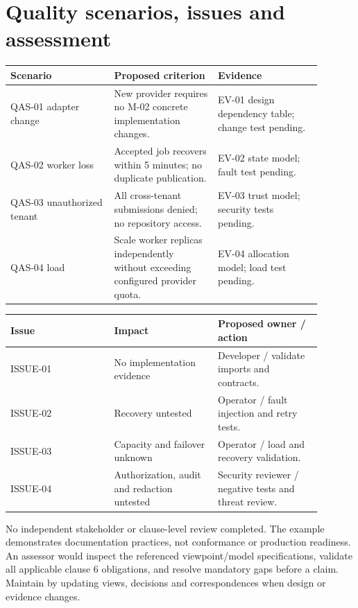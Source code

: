 \documentclass[11pt,letterpaper]{article}
\newcommand{\docsection}[1]{\Needspace{5\baselineskip}\section{#1}}
\begin{document}
\docsection{Quality scenarios, issues and assessment}
\begin{longtable}{@{}>{\RaggedRight\arraybackslash}p{0.297\linewidth}>{\RaggedRight\arraybackslash}p{0.297\linewidth}>{\RaggedRight\arraybackslash}p{0.297\linewidth}@{}}
\toprule
\textbf{Scenario} & \textbf{Proposed criterion} & \textbf{Evidence}\\\midrule
\endhead
QAS-01 adapter change & New provider requires no M-02 concrete implementation changes. & EV-01 design dependency table; change test pending.\\
QAS-02 worker loss & Accepted job recovers within 5 minutes; no duplicate publication. & EV-02 state model; fault test pending.\\
QAS-03 unauthorized tenant & All cross-tenant submissions denied; no repository access. & EV-03 trust model; security tests pending.\\
QAS-04 load & Scale worker replicas independently without exceeding configured provider quota. & EV-04 allocation model; load test pending.\\
\bottomrule
\end{longtable}
\begin{longtable}{@{}>{\RaggedRight\arraybackslash}p{0.297\linewidth}>{\RaggedRight\arraybackslash}p{0.297\linewidth}>{\RaggedRight\arraybackslash}p{0.297\linewidth}@{}}
\toprule
\textbf{Issue} & \textbf{Impact} & \textbf{Proposed owner / action}\\\midrule
\endhead
ISSUE-01 & No implementation evidence & Developer / validate imports and contracts.\\
ISSUE-02 & Recovery untested & Operator / fault injection and retry tests.\\
ISSUE-03 & Capacity and failover unknown & Operator / load and recovery validation.\\
ISSUE-04 & Authorization, audit and redaction untested & Security reviewer / negative tests and threat review.\\
\bottomrule
\end{longtable}
No independent stakeholder or clause-level review completed. The example demonstrates documentation practices, not conformance or production readiness. An assessor would inspect the referenced viewpoint/model specifications, validate all applicable clause 6 obligations, and resolve mandatory gaps before a claim. Maintain by updating views, decisions and correspondences when design or evidence changes.
\end{document}
